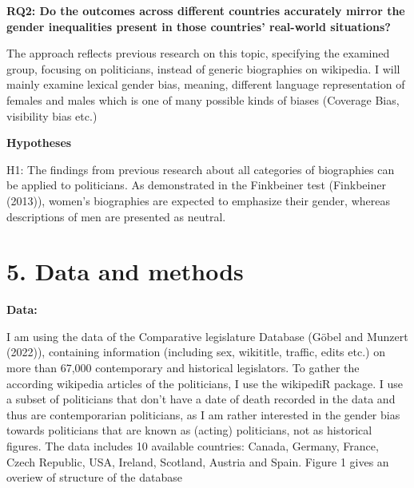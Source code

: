\documentclass[
]{article}
\begin{document}
\textbf{RQ2: Do the outcomes across different countries accurately
mirror the gender inequalities present in those countries' real-world
situations?}

The approach reflects previous research on this topic, specifying the
examined group, focusing on politicians, instead of generic biographies
on wikipedia. I will mainly examine lexical gender bias, meaning,
different language representation of females and males which is one of
many possible kinds of biases (Coverage Bias, visibility bias etc.)

\textbf{Hypotheses}

H1: The findings from previous research about all categories of
biographies can be applied to politicians. As demonstrated in the
Finkbeiner test (Finkbeiner (2013)), women's biographies are expected to
emphasize their gender, whereas descriptions of men are presented as
neutral.

\hypertarget{data-and-methods}{%
\section{5. Data and methods}\label{data-and-methods}}

\textbf{Data:}

I am using the data of the Comparative legislature Database (Göbel and
Munzert (2022)), containing information (including sex, wikititle,
traffic, edits etc.) on more than 67,000 contemporary and historical
legislators. To gather the according wikipedia articles of the
politicians, I use the wikipediR package. I use a subset of politicians
that don't have a date of death recorded in the data and thus are
contemporarian politicians, as I am rather interested in the gender bias
towards politicians that are known as (acting) politicians, not as
historical figures. The data includes 10 available countries: Canada,
Germany, France, Czech Republic, USA, Ireland, Scotland, Austria and
Spain. Figure 1 gives an overiew of structure of the database
\end{document}
